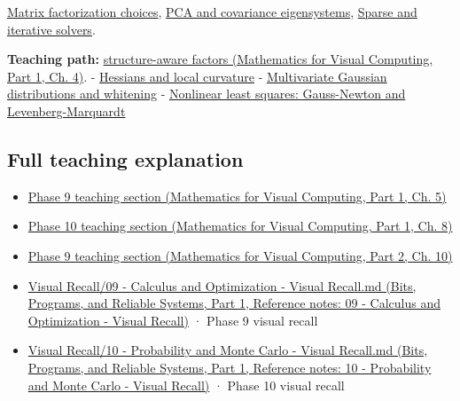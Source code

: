 \hypertarget{appendix-50d2ea3c9b26-used-by}{}

\hyperref[appendix-221a483bec2d]{Matrix factorization choices}, \hyperref[appendix-ad175ef3c5bf]{PCA and covariance eigensystems}, \hyperref[appendix-67c87a3d9e94]{Sparse and iterative solvers}.

\textbf{Teaching path:} \href{../02-Mathematics-for-Visual-Computing-P01/main.pdf\#01-foundations-i-ch020-structure-makes-a-decomposition-a-better-tool-than-generic-elimination}{structure-aware factors (Mathematics for Visual Computing, Part 1, Ch. 4)}. - \hyperref[appendix-6ac071f8b50c]{Hessians and local curvature} - \hyperref[appendix-12bbe185dbe5]{Multivariate Gaussian distributions and whitening} - \hyperref[appendix-2c2df8345991]{Nonlinear least squares: Gauss-Newton and Levenberg-Marquardt}

\subsection{Full teaching explanation}\label{appendix-50d2ea3c9b26-full-teaching-explanation}

\hypertarget{appendix-50d2ea3c9b26-full-teaching-explanation}{}

\begin{itemize}
\tightlist
\item
  \href{../02-Mathematics-for-Visual-Computing-P01/main.pdf\#02-foundations-ii-ch021-jacobians-curvature-and-local-approximation}{Phase 9 teaching section (Mathematics for Visual Computing, Part 1, Ch. 5)}
\item
  \href{../02-Mathematics-for-Visual-Computing-P01/main.pdf\#02-foundations-ii-ch024-waiting-times-event-counts-and-covariance-geometry}{Phase 10 teaching section (Mathematics for Visual Computing, Part 1, Ch. 8)}
\item
  \href{../02-Mathematics-for-Visual-Computing-P02/main.pdf\#02-foundations-ii-ch026-optimization-and-inverse-problems}{Phase 9 teaching section (Mathematics for Visual Computing, Part 2, Ch. 10)}
\item
  \href{../01-Bits-Programs-and-Reliable-Systems-P01/main.pdf\#appendix-adf48f5dc5c1}{Visual Recall/09 - Calculus and Optimization - Visual Recall.md (Bits, Programs, and Reliable Systems, Part 1, Reference notes: 09 - Calculus and Optimization - Visual Recall)} · Phase 9 visual recall
\item
  \href{../01-Bits-Programs-and-Reliable-Systems-P01/main.pdf\#appendix-cb5af353ef77}{Visual Recall/10 - Probability and Monte Carlo - Visual Recall.md (Bits, Programs, and Reliable Systems, Part 1, Reference notes: 10 - Probability and Monte Carlo - Visual Recall)} · Phase 10 visual recall
\end{itemize}
